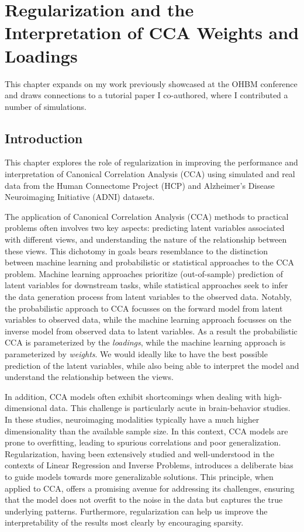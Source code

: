 \chapter{Regularization and the Interpretation of CCA Weights and Loadings}\label{chap:als}
\minitoc
This chapter expands on my work previously showcased at the OHBM conference and draws connections to a tutorial paper I co-authored, where I contributed a number of simulations\citep{mihalik2022canonical}.

\section{Introduction}\label{sec:introduction}

This chapter explores the role of regularization in improving the performance and interpretation of Canonical
Correlation Analysis (CCA) using simulated and real data from the Human Connectome Project (HCP) and Alzheimer's Disease Neuroimaging Initiative (ADNI) datasets.

The application of Canonical Correlation Analysis (CCA) methods to practical problems often involves two key aspects: predicting latent variables associated with different views, and understanding the nature of the relationship between these views.
This dichotomy in goals bears resemblance to the distinction between machine learning and probabilistic or statistical approaches to the CCA problem.
Machine learning approaches prioritize (out-of-sample) prediction of latent variables for downstream tasks, while statistical approaches seek to infer the data generation process from latent variables to the observed data.
Notably, the probabilistic approach to CCA focusses on the forward model from latent variables to observed data, while the machine learning approach focusses on the inverse model from observed data to latent variables.
As a result the probabilistic CCA is parameterized by the \textit{loadings}, while the machine learning approach is parameterized by \textit{weights}.
We would ideally like to have the best possible prediction of the latent variables, while also being able to interpret the model and understand the relationship between the views.

In addition, CCA models often exhibit shortcomings when dealing with high-dimensional data.
This challenge is particularly acute in brain-behavior studies.
In these studies, neuroimaging modalities typically have a much higher dimensionality than the available sample size.
In this context, CCA models are prone to overfitting, leading to spurious correlations and poor generalization.
Regularization, having been extensively studied and well-understood in the contexts of Linear Regression and Inverse Problems, introduces a deliberate bias to guide models towards more generalizable solutions.
This principle, when applied to CCA, offers a promising avenue for addressing its challenges, ensuring that the model does not overfit to the noise in the data but captures the true underlying patterns.
Furthermore, regularization can help us improve the interpretability of the results most clearly by encouraging sparsity.

